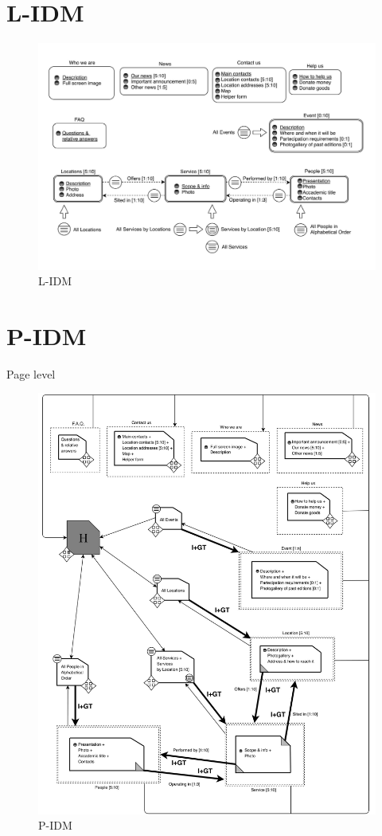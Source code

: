 \section{L-IDM}
%
\begin{figure}[h]
\includegraphics[width=1.3\textwidth, center]{MainMatter/images/L-IDM.jpg}
\caption{L-IDM}
\label{fig:figure2}
\end{figure}
\newpage
%
\section{P-IDM}
%
Page level 
\begin{figure}[h]
\includegraphics[width=.9 \textwidth, center]{MainMatter/images/P-IDM.jpg}
\caption{P-IDM}
\label{fig:figure3}
\end{figure}
